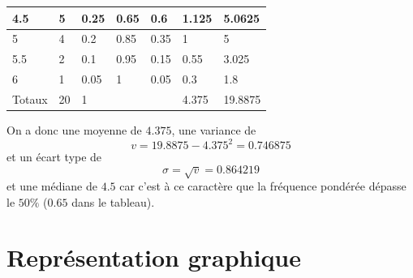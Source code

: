 \begin{landscape}
\begin{exemple}
\begin{tabular}{|l|llllll}
4.5                  & \multicolumn{1}{l|}{5}        & \multicolumn{1}{l|}{0.25}      & \multicolumn{1}{l|}{0.65}              & \multicolumn{1}{l|}{0.6}                   & \multicolumn{1}{l|}{1.125}              & \multicolumn{1}{l|}{5.0625}                     \\ \hline
5                    & \multicolumn{1}{l|}{4}        & \multicolumn{1}{l|}{0.2}       & \multicolumn{1}{l|}{0.85}              & \multicolumn{1}{l|}{0.35}                  & \multicolumn{1}{l|}{1}                  & \multicolumn{1}{l|}{5}                          \\ \hline
5.5                  & \multicolumn{1}{l|}{2}        & \multicolumn{1}{l|}{0.1}       & \multicolumn{1}{l|}{0.95}              & \multicolumn{1}{l|}{0.15}                  & \multicolumn{1}{l|}{0.55}               & \multicolumn{1}{l|}{3.025}                      \\ \hline
6                    & \multicolumn{1}{l|}{1}        & \multicolumn{1}{l|}{0.05}      & \multicolumn{1}{l|}{1}                 & \multicolumn{1}{l|}{0.05}                  & \multicolumn{1}{l|}{0.3}                & \multicolumn{1}{l|}{1.8}                        \\ \hline
Totaux               & \multicolumn{1}{l|}{20}       & \multicolumn{1}{l|}{1}         &                                        & \multicolumn{1}{l|}{}                      & \multicolumn{1}{l|}{4.375}              & \multicolumn{1}{l|}{19.8875}                    \\ \cline{1-3} \cline{6-7} 
\end{tabular}

\vspace{5mm}

On a donc une moyenne de $4.375$, une variance de 
$$
v = 19.8875 - 4.375^2 = 0.746875
$$
et un écart type de
$$
\sigma = \sqrt{v} = 0.864219
$$
et une médiane de $4.5$ car c'est à ce caractère que la fréquence pondérée dépasse le $50\%$ ($0.65$ dans le tableau).
\end{exemple}
\end{landscape}

\section{Représentation graphique}

